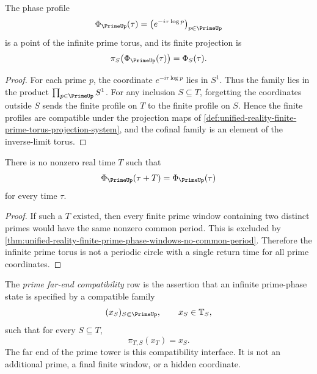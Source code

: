 \begin{theorem}
\label{thm:unified-reality-prime-phase-flow-lands-in-inverse-limit-torus}
The phase profile
$$
\Phi_{\PrimeUp}(\tau)
=
\left(e^{-i\tau\log p}\right)_{p\in\PrimeUp}
$$
is a point of the infinite prime torus, and its finite projection is
$$
\pi_S\bigl(\Phi_{\PrimeUp}(\tau)\bigr)=\Phi_S(\tau).
$$
\end{theorem}

\begin{proof}
For each prime $p$, the coordinate $e^{-i\tau\log p}$ lies in $S^1$.
Thus the family lies in the product
$\prod_{p\in\PrimeUp}S^1$.  For any inclusion $S\subseteq T$, forgetting
the coordinates outside $S$ sends the finite profile on $T$ to the
finite profile on $S$.  Hence the finite profiles are compatible under
the projection maps of
\autoref{def:unified-reality-finite-prime-torus-projection-system}, and
the cofinal family is an element of the inverse-limit torus.
\end{proof}

\begin{theorem}
\label{thm:unified-reality-infinite-prime-torus-no-common-period-point}
There is no nonzero real time $T$ such that
$$
\Phi_{\PrimeUp}(\tau+T)=\Phi_{\PrimeUp}(\tau)
$$
for every time $\tau$.
\end{theorem}

\begin{proof}
If such a $T$ existed, then every finite prime window containing two
distinct primes would have the same nonzero common period.  This is
excluded by
\autoref{thm:unified-reality-finite-prime-phase-windows-no-common-period}.
Therefore the infinite prime torus is not a periodic circle with a
single return time for all prime coordinates.
\end{proof}

\begin{definition}
\label{def:unified-reality-prime-far-end-compatibility}
The \emph{prime far-end compatibility} row is the assertion that an
infinite prime-phase state is specified by a compatible family
$$
(x_S)_{S\Subset\PrimeUp},
\qquad
x_S\in\mathbb T_S,
$$
such that for every $S\subseteq T$,
$$
\pi_{T,S}(x_T)=x_S.
$$
The far end of the prime tower is this compatibility interface.  It is
not an additional prime, a final finite window, or a hidden coordinate.
\end{definition}

